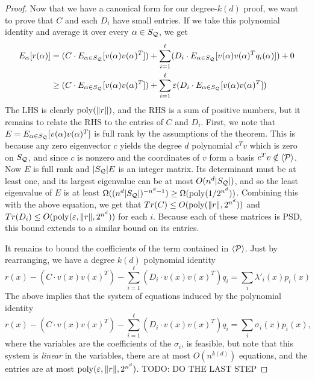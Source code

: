 \begin{proof}
Now that we have a canonical form for our degree-$k(d)$ proof, we want to prove that $C$ and each $D_i$ have small entries. If we take this polynomial identity and average it over every $\alpha \in S_{\mathcal Q}$, we get
\begin{align*}
E_\alpha[r(\alpha)] &= (C \cdot E_{\alpha \in S_{\mathcal Q}}[v(\alpha)v(\alpha)^T]) + \sum_{i=1}^\ell (D_i \cdot E_{\alpha \in S_{\mathcal Q}}[v(\alpha)v(\alpha)^Tq_i(\alpha)]) + 0\\
&\geq (C \cdot E_{\alpha \in S_{\mathcal Q}}[v(\alpha)v(\alpha)^T]) + \sum_{i=1}^\ell \varepsilon(D_i \cdot E_{\alpha \in S_{\mathcal Q}}[v(\alpha)v(\alpha)^T])
\end{align*}
The LHS is clearly $\operatorname{poly}(\|r\|)$, and the RHS is a sum of positive numbers, but it remains to relate the RHS to the entries of $C$ and $D_i$. First, we note that $E = E_{\alpha \in S_{\mathcal Q}}[v(\alpha)v(\alpha)^T]$ is full rank by the assumptions of the theorem. This is because any zero eigenvector $c$ yields the degree $d$ polynomial $c^Tv$ which is zero on $S_{\mathcal Q}$, and since $c$ is nonzero and the coordinates of $v$ form a basis $c^Tv \notin \langle \mathcal P\rangle$. Now $E$ is full rank and $|S_{\mathcal Q}|E$ is an integer matrix. Its determinant must be at least one, and its largest eigenvalue can be at most $O(n^d|S_{\mathcal Q}|)$, and so the least eigenvalue of $E$ is at least $\Omega((n^d|S_{\mathcal Q}|)^{-n^d-1}) \geq \Omega(\operatorname{poly}(1/{2^{n^d}}))$. Combining this with the above equation, we get that $Tr(C) \leq O(\operatorname{poly}(\|r\|,2^{n^d}))$ and $Tr(D_i) \leq O(\operatorname{poly}(\varepsilon,\|r\|,2^{n^d}))$ for each $i$. Because each of these matrices is PSD, this bound extends to a similar bound on its entries.

It remains to bound the coefficients of the term contained in $\langle \mathcal P\rangle$. Just by rearranging, we have a degree $k(d)$ polynomial identity
\[r(x) - (C \cdot v(x)v(x)^T) - \sum_{i=1}^\ell (D_i \cdot v(x)v(x)^T)q_i = \sum_i \lambda'_i(x)p_i(x)\]
The above implies that the system of equations induced by the polynomial identity 
\[r(x) - (C \cdot v(x)v(x)^T) - \sum_{i=1}^\ell (D_i \cdot v(x)v(x)^T)q_i = \sum_i \sigma_i(x)p_i(x),\]
where the variables are the coefficients of the $\sigma_i$, is feasible, but note that this system is \emph{linear} in the variables, there are at most $O(n^{k(d)})$ equations, and the entries are at most $\operatorname{poly}(\varepsilon,\|r\|,2^{n^d})$. TODO: DO THE LAST STEP 


\end{proof}
